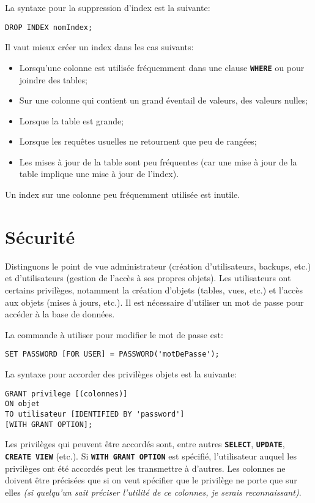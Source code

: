 \documentclass[a4paper, 12pt]{report}
\newcommand{\textSQL}[1]{\texttt{\textbf{#1}}}
\theoremstyle{definition} \newtheorem{ex}{Exemple}
\begin{document}
La syntaxe pour la suppression d'index est la suivante:
\begin{lstlisting}[frame=single]
DROP INDEX nomIndex;
\end{lstlisting}

Il vaut mieux créer un index dans les cas suivants:
\begin{itemize}
  \item Lorsqu'une colonne est utilisée fréquemment dans une clause \textSQL{WHERE} ou pour joindre des tables;
	\item Sur une colonne qui contient un grand éventail de valeurs, des valeurs nulles;
	\item Lorsque la table est grande;
	\item Lorsque les requêtes usuelles ne retournent que peu de rangées;
	\item Les mises à jour de la table sont peu fréquentes (car une mise à jour de la table implique une mise à jour de l'index).
\end{itemize}

Un index sur une colonne peu fréquemment utilisée est inutile.
\chapter{Sécurité}
Distinguons le point de vue administrateur (création d'utilisateurs, backups, etc.) et d'utilisateurs (gestion de l'accès à ses propres objets). Les utilisateurs ont certains privilèges, notamment la création d'objets (tables, vues, etc.) et l'accès aux objets (mises à jours, etc.). Il est nécessaire d'utiliser un mot de passe pour accéder à la base de données.

La commande à utiliser pour modifier le mot de passe est:
\begin{lstlisting}[frame=single]
SET PASSWORD [FOR USER] = PASSWORD('motDePasse');
\end{lstlisting}

La syntaxe pour accorder des privilèges objets est la suivante:
\begin{lstlisting}[frame=single]
GRANT privilege [(colonnes)]
ON objet
TO utilisateur [IDENTIFIED BY 'password']
[WITH GRANT OPTION];
\end{lstlisting}
Les privilèges qui peuvent être accordés sont, entre autres \textSQL{SELECT}, \textSQL{UPDATE}, \textSQL{CREATE VIEW} (etc.). Si \textSQL{WITH GRANT OPTION} est spécifié, l'utilisateur auquel les privilèges ont été accordés peut les transmettre à d'autres. Les colonnes ne doivent être précisées que si on veut spécifier que le privilège ne porte que sur elles \emph{(si quelqu'un sait préciser l'utilité de ce colonnes, je serais reconnaissant)}.
\end{document}

